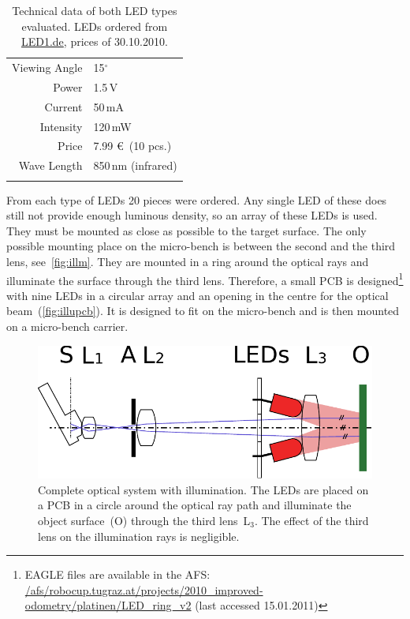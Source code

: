 \documentclass[12pt,a4paper]{article}
\begin{document}
\begin{table}[htbp]
\begin{minipage}{0.45\textwidth}
\begin{tabular}{r|l}
       Viewing Angle  & 15$^\circ$     \\
       Power & 1.5\,V     \\
       Current & 50\,mA     \\
       Intensity & 120\,mW     \\
       Price & 7.99 \euro\ (10 pcs.)     \\
       Wave Length & 850\,nm (infrared)     \\
       &
    \end{tabular}
  \end{minipage}
  \caption{Technical data of both LED types evaluated.
  LEDs ordered from \href{http://www.led1.de}{LED1.de}, prices of 30.10.2010.}
  \label{table:leds}
\end{table}

From each type of LEDs 20 pieces were ordered.
Any single LED of these does still not provide enough luminous density, so an array of these LEDs is used.
They must be mounted as close as possible to the target surface.
The only possible mounting place on the micro-bench is between the second and the third lens, see~\autoref{fig:illm}.
They are mounted in a ring around the optical rays and illuminate the surface through the third lens.
Therefore, a small PCB is designed\footnote{EAGLE files are available in the AFS: \url{/afs/robocup.tugraz.at/projects/2010_improved-odometry/platinen/LED_ring_v2} (last accessed 15.01.2011)} with nine LEDs in a circular array and an opening in the centre for the optical beam~(\autoref{fig:illupcb}).
It is designed to fit on the micro-bench and is then mounted on a micro-bench carrier.

\begin{figure}[htbp]
\begin{center}
\includegraphics[width=0.8\columnwidth]{figures/sketch-optic.pdf}
\caption{\label{fig:illm}
Complete optical system with illumination.
The LEDs are placed on a PCB in a circle around the optical ray path and illuminate the object surface~(O) through the third lens~L$_3$.
The effect of the third lens on the illumination rays is negligible.
}
\end{center}
\end{figure}
\end{document}
